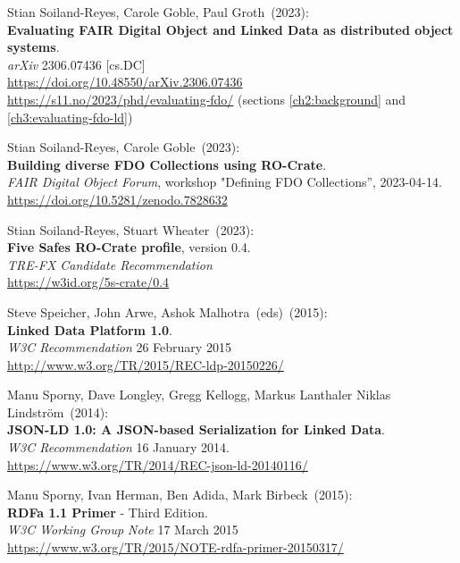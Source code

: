 \begin{thebibliography}{9}
Stian Soiland-Reyes, Carole Goble, Paul Groth~(2023): \\
\textbf{Evaluating FAIR Digital Object and Linked Data as distributed object systems}.\\
\emph{arXiv} 2306.07436 [cs.DC] \\
\url{https://doi.org/10.48550/arXiv.2306.07436}\\
\url{https://s11.no/2023/phd/evaluating-fdo/}
(sections \vref{ch2:background} and \vref{ch3:evaluating-fdo-ld})

Stian Soiland-Reyes, Carole Goble~(2023): \\
\textbf{Building diverse FDO Collections using RO-Crate}.\\
\emph{FAIR Digital Object Forum}, workshop "Defining FDO Collections”, 2023-04-14.\\
\url{https://doi.org/10.5281/zenodo.7828632}

Stian Soiland-Reyes, Stuart Wheater~(2023): \\
\textbf{Five Safes RO-Crate profile}, version 0.4.\\
\emph{TRE-FX Candidate Recommendation} \\
\url{https://w3id.org/5s-crate/0.4}

Steve Speicher, John Arwe, Ashok Malhotra~(eds)~(2015): \\
\textbf{Linked Data Platform 1.0}.\\ 
\emph{W3C Recommendation} 26 February 2015\\
\url{http://www.w3.org/TR/2015/REC-ldp-20150226/}

Manu Sporny, Dave Longley,  Gregg Kellogg,  Markus Lanthaler
Niklas Lindström~(2014): \\
\textbf{JSON-LD 1.0: A JSON-based Serialization for Linked Data}.\\
\emph{W3C Recommendation} 16 January 2014.\\
\url{https://www.w3.org/TR/2014/REC-json-ld-20140116/}

Manu Sporny, Ivan Herman, Ben Adida, Mark Birbeck~(2015): \\
\textbf{RDFa 1.1 Primer} - Third Edition. \\
\emph{W3C Working Group Note} 17 March 2015 \\
\url{https://www.w3.org/TR/2015/NOTE-rdfa-primer-20150317/}


\end{thebibliography}
